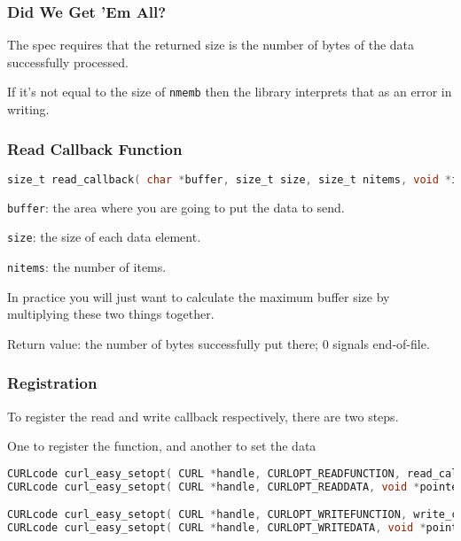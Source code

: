 \begin{frame}
	\frametitle{Did We Get 'Em All?}

	The spec requires that the returned size is the number of bytes of the data successfully processed.

	If it's not equal to the size of \texttt{nmemb} then the library interprets that as an error in writing.

\end{frame}



\begin{frame}[fragile]
	\frametitle{Read Callback Function}

	\begin{lstlisting}[language=C]
size_t read_callback( char *buffer, size_t size, size_t nitems, void *inputdata );
\end{lstlisting}


	\texttt{buffer}: the area where you are going to put the data to send.

	\texttt{size}: the size of each data element.

	\texttt{nitems}: the number of items.

	In practice you will just want to calculate the maximum buffer size by multiplying these two things together.

	Return value: the number of bytes successfully put there; 0 signals end-of-file.

\end{frame}



\begin{frame}[fragile]
	\frametitle{Registration}

	To register the read and write callback respectively, there are two steps.

	One to register the function, and another to set the data

	\begin{lstlisting}[language=C]
CURLcode curl_easy_setopt( CURL *handle, CURLOPT_READFUNCTION, read_callback );
CURLcode curl_easy_setopt( CURL *handle, CURLOPT_READDATA, void *pointer );

CURLcode curl_easy_setopt( CURL *handle, CURLOPT_WRITEFUNCTION, write_callback );
CURLcode curl_easy_setopt( CURL *handle, CURLOPT_WRITEDATA, void *pointer );
\end{lstlisting}

\end{frame}




